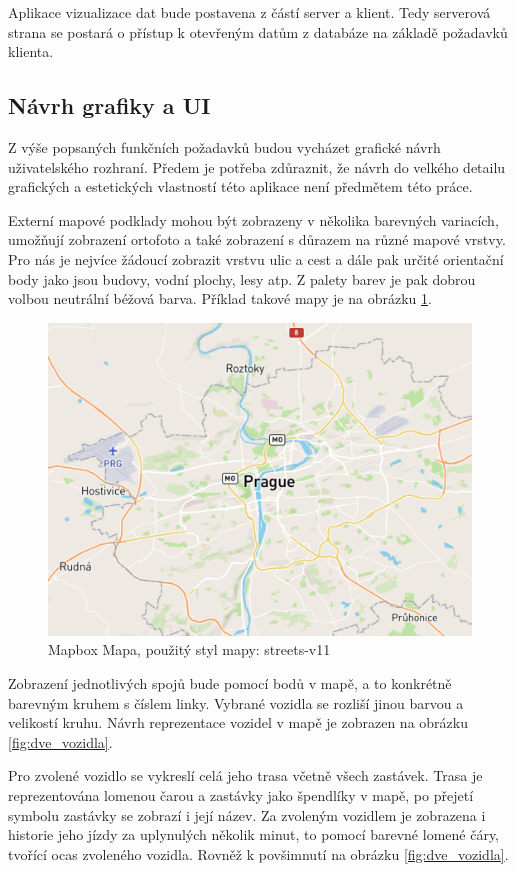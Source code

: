  Aplikace vizualizace dat bude postavena z částí server a klient. Tedy serverová strana se postará o přístup k otevřeným datům z databáze na základě požadavků klienta.


\subsection{Návrh grafiky a UI}


Z výše popsaných funkčních požadavků budou vycházet grafické návrh uživatelského rozhraní. Předem je potřeba zdůraznit, že návrh do velkého detailu grafických a estetických vlastností této aplikace není předmětem této práce.


\bigbreak


Externí mapové podklady mohou být zobrazeny v několika barevných variacích, umožňují zobrazení ortofoto a také zobrazení s důrazem na různé mapové vrstvy. Pro nás je nejvíce žádoucí zobrazit vrstvu ulic a cest a dále pak určité orientační body jako jsou budovy, vodní plochy, lesy atp. Z palety barev je pak dobrou volbou neutrální béžová barva. Příklad takové mapy je na obrázku \ref{fig:mapbox_mapa}.


\begin{figure}
\centering
  \includegraphics[width=0.5\linewidth]{../img/mapa_mapbox.png}
  \caption{Mapbox Mapa, použitý styl mapy: streets-v11}
  \label{fig:mapbox_mapa}
\end{figure}


Zobrazení jednotlivých spojů bude pomocí bodů v mapě, a to konkrétně barevným kruhem s číslem linky. Vybrané vozidla se rozliší jinou barvou a velikostí kruhu. Návrh reprezentace vozidel v mapě je zobrazen na obrázku \ref{fig:dve_vozidla}.


\bigbreak


Pro zvolené vozidlo se vykreslí celá jeho trasa včetně všech zastávek. Trasa je reprezentována lomenou čarou a zastávky jako špendlíky v mapě, po přejetí symbolu zastávky se zobrazí i její název. Za zvoleným vozidlem je zobrazena i historie jeho jízdy za uplynulých několik minut, to pomocí barevné lomené čáry, tvořící ocas zvoleného vozidla. Rovněž k povšimnutí na obrázku \ref{fig:dve_vozidla}.


